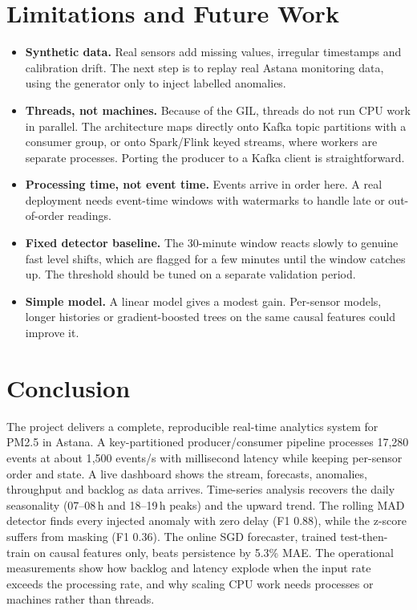\documentclass[11pt]{article}
\begin{document}
\section{Limitations and Future Work}
\begin{itemize}\itemsep0pt
\item \textbf{Synthetic data.} Real sensors add missing values, irregular timestamps and calibration drift. The next step is to replay real Astana monitoring data, using the generator only to inject labelled anomalies.
\item \textbf{Threads, not machines.} Because of the GIL, threads do not run CPU work in parallel. The architecture maps directly onto Kafka topic partitions with a consumer group, or onto Spark/Flink keyed streams, where workers are separate processes. Porting the producer to a Kafka client is straightforward.
\item \textbf{Processing time, not event time.} Events arrive in order here. A real deployment needs event-time windows with watermarks to handle late or out-of-order readings.
\item \textbf{Fixed detector baseline.} The 30-minute window reacts slowly to genuine fast level shifts, which are flagged for a few minutes until the window catches up. The threshold should be tuned on a separate validation period.
\item \textbf{Simple model.} A linear model gives a modest gain. Per-sensor models, longer histories or gradient-boosted trees on the same causal features could improve it.
\end{itemize}

\section{Conclusion}
The project delivers a complete, reproducible real-time analytics system for PM2.5 in Astana. A key-partitioned producer/consumer pipeline processes 17{,}280 events at about 1{,}500 events/s with millisecond latency while keeping per-sensor order and state. A live dashboard shows the stream, forecasts, anomalies, throughput and backlog as data arrives. Time-series analysis recovers the daily seasonality (07--08\,h and 18--19\,h peaks) and the upward trend. The rolling MAD detector finds every injected anomaly with zero delay (F1 0.88), while the z-score suffers from masking (F1 0.36). The online SGD forecaster, trained test-then-train on causal features only, beats persistence by 5.3\% MAE. The operational measurements show how backlog and latency explode when the input rate exceeds the processing rate, and why scaling CPU work needs processes or machines rather than threads.
\end{document}
